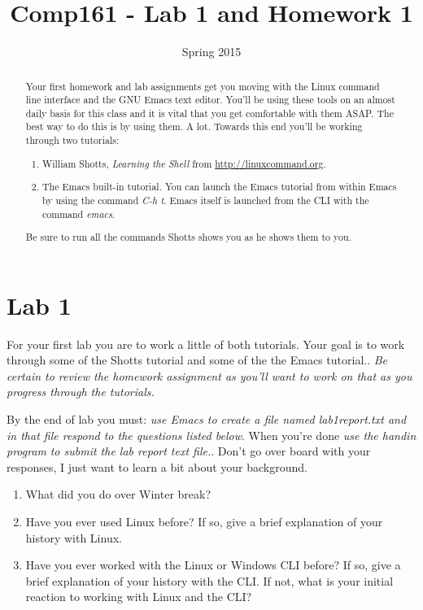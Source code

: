 \documentclass[]{tufte-handout}
\title{Comp161 - Lab 1 and Homework 1}
\author{}
\date{ Spring 2015 }
\begin{document}
\maketitle

\begin{abstract}
Your first homework and lab assignments get you moving with the Linux command line interface and the GNU Emacs text editor.  You'll be using these tools on an almost daily basis for this class and it is vital that you get comfortable with them ASAP. The best way to do this is by using them.  A lot. Towards this end you'll be working through two tutorials:
\begin{enumerate}
\item William Shotts, \textit{Learning the Shell} from \url{http://linuxcommand.org}.
\item The Emacs built-in tutorial. You can launch the Emacs tutorial from within Emacs by using the command \textit{C-h t}.  Emacs itself is launched from the CLI with the command \textit{emacs}.
\end{enumerate}
Be sure to run all the commands Shotts shows you as he shows them to you. 
\end{abstract}


\section{Lab 1}

For your first lab you are to work a little of both tutorials.  Your goal is to work through some of the  Shotts tutorial and some of the the Emacs tutorial..  \textit{Be certain to review the homework assignment as you'll want to work on that as you progress through the tutorials.} 

By the end of lab you must: \textit{use Emacs to create a file named lab1report.txt and in that file respond to the questions listed below}. When you're done \textit{use the \textit{handin} program}\textit{ to submit the lab report text file.}.  Don't go over board with your responses, I just want to learn a bit about your background.
\begin{enumerate}
\item What did you do over Winter break?
\item Have you ever used Linux before? If so, give a brief explanation of your history with Linux.
\item Have you ever worked with the Linux or Windows CLI before? If so, give a brief explanation of your history with the CLI. If not, what is your initial reaction to working with Linux and the CLI?
\end{enumerate}
\end{document}
